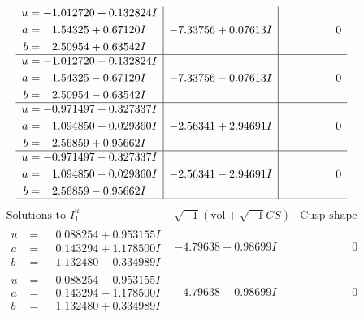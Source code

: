 \documentclass[1p]{elsarticle_modified}
\theoremstyle{definition}
\newcommand{\I}{\sqrt{-1}}
\begin{document}
$$\begin{array}{c|c|c}
\begin{aligned}
u &= -1.012720 + 0.132824 I \\
a &= \phantom{-}1.54325 + 0.67120 I \\
b &= \phantom{-}2.50954 + 0.63542 I\end{aligned}
 & -7.33756 + 0.07613 I & \phantom{-0.000000 } 0 \\ \hline\begin{aligned}
u &= -1.012720 - 0.132824 I \\
a &= \phantom{-}1.54325 - 0.67120 I \\
b &= \phantom{-}2.50954 - 0.63542 I\end{aligned}
 & -7.33756 - 0.07613 I & \phantom{-0.000000 } 0 \\ \hline\begin{aligned}
u &= -0.971497 + 0.327337 I \\
a &= \phantom{-}1.094850 + 0.029360 I \\
b &= \phantom{-}2.56859 + 0.95662 I\end{aligned}
 & -2.56341 + 2.94691 I & \phantom{-0.000000 } 0 \\ \hline\begin{aligned}
u &= -0.971497 - 0.327337 I \\
a &= \phantom{-}1.094850 - 0.029360 I \\
b &= \phantom{-}2.56859 - 0.95662 I\end{aligned}
 & -2.56341 - 2.94691 I & \phantom{-0.000000 } 0\\
 \hline 
 \end{array}$$\newpage$$\begin{array}{c|c|c}  
\text{Solutions to }I^u_{1}& \I (\text{vol} + \sqrt{-1}CS) & \text{Cusp shape}\\
 \hline 
\begin{aligned}
u &= \phantom{-}0.088254 + 0.953155 I \\
a &= \phantom{-}0.143294 + 1.178500 I \\
b &= \phantom{-}1.132480 - 0.334989 I\end{aligned}
 & -4.79638 + 0.98699 I & \phantom{-0.000000 } 0 \\ \hline\begin{aligned}
u &= \phantom{-}0.088254 - 0.953155 I \\
a &= \phantom{-}0.143294 - 1.178500 I \\
b &= \phantom{-}1.132480 + 0.334989 I\end{aligned}
 & -4.79638 - 0.98699 I & \phantom{-0.000000 } 0 \\ \hline\begin{aligned}

\end{aligned}
\end{array}$$
\end{document}
